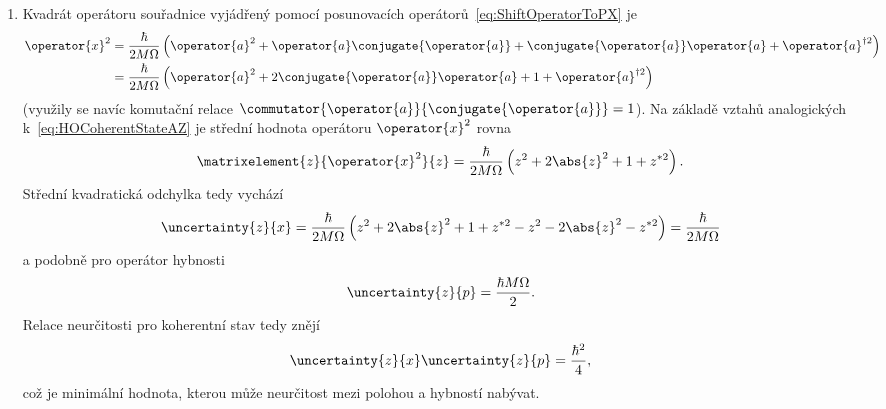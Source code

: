 \begin{solution}
\begin{enumerate}
	\item
		Kvadrát operátoru souřadnice vyjádřený pomocí posunovacích operátorů~\eqref{eq:ShiftOperatorToPX} je
		\begin{align}
			\operator{x}^{2}
				&=\frac{\hbar}{2M\Omega}\left(\operator{a}^{2}+\operator{a}\conjugate{\operator{a}}+\conjugate{\operator{a}}\operator{a}+\operator{a}^{\dagger 2}\right)
					\nonumber\\
				&=\frac{\hbar}{2M\Omega}\left(\operator{a}^{2}+2\conjugate{\operator{a}}\operator{a}+1+\operator{a}^{\dagger 2}\right)
		\end{align}
		(využily se navíc komutační relace $\commutator{\operator{a}}{\conjugate{\operator{a}}}=1$).
		Na základě vztahů analogických k~\eqref{eq:HOCoherentStateAZ} je střední hodnota operátoru $\operator{x}^{2}$ rovna
		\begin{equation}
			\matrixelement{z}{\operator{x}^{2}}{z}=\frac{\hbar}{2M\Omega}\left(z^{2}+2\abs{z}^{2}+1+z^{*2}\right).
		\end{equation}
		Střední kvadratická odchylka tedy vychází
		\begin{equation}
			\uncertainty{z}{x}
				=\frac{\hbar}{2M\Omega}
					\left(z^{2}+2\abs{z}^{2}+1+z^{*2}-z^{2}-2\abs{z}^{2}-z^{*2}\right)
				=\frac{\hbar}{2M\Omega}
		\end{equation}
		a podobně pro operátor hybnosti
		\begin{equation}
			\uncertainty{z}{p}=\frac{\hbar M\Omega}{2}.
		\end{equation}
		Relace neurčitosti pro koherentní stav tedy znějí
		\begin{equation}
			\label{eq:HOCoherentStateUncertainty}
			\uncertainty{z}{x}\uncertainty{z}{p}=\frac{\hbar^{2}}{4},
		\end{equation}
		což je minimální hodnota, kterou může neurčitost mezi polohou a hybností nabývat.
	\end{enumerate}
\end{solution}
